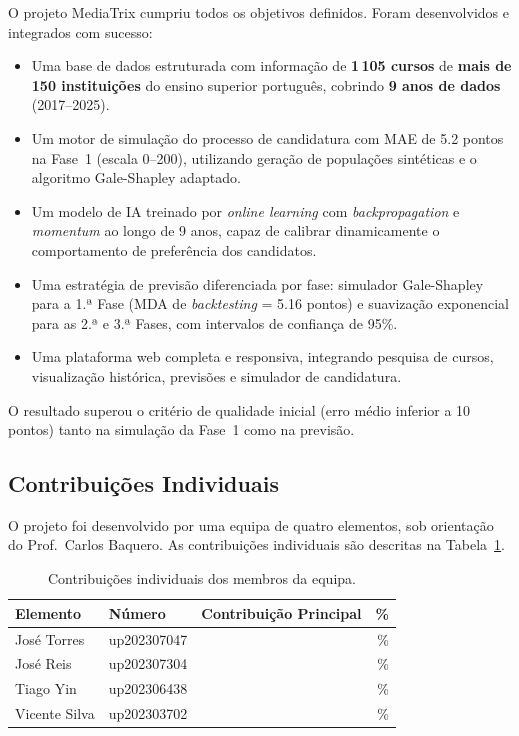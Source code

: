 \documentclass[12pt,a4paper]{article}
\begin{document}
O projeto MediaTrix cumpriu todos os objetivos definidos. Foram desenvolvidos e integrados com sucesso:

\begin{itemize}[noitemsep]
  \item Uma base de dados estruturada com informação de \textbf{1\,105 cursos} de \textbf{mais de 150 instituições} do ensino superior português, cobrindo \textbf{9 anos de dados} (2017--2025).
  \item Um motor de simulação do processo de candidatura com MAE de 5.2 pontos na Fase~1 (escala 0--200), utilizando geração de populações sintéticas e o algoritmo Gale-Shapley adaptado.
  \item Um modelo de IA treinado por \textit{online learning} com \textit{backpropagation} e \textit{momentum} ao longo de 9 anos, capaz de calibrar dinamicamente o comportamento de preferência dos candidatos.
  \item Uma estratégia de previsão diferenciada por fase: simulador Gale-Shapley para a 1.ª Fase (MDA de \textit{backtesting} = 5.16 pontos) e suavização exponencial para as 2.ª e 3.ª Fases, com intervalos de confiança de 95\%.
  \item Uma plataforma web completa e responsiva, integrando pesquisa de cursos, visualização histórica, previsões e simulador de candidatura.
\end{itemize}

O resultado superou o critério de qualidade inicial (erro médio inferior a 10 pontos) tanto na simulação da Fase~1 como na previsão.

\subsection{Contribuições Individuais}

O projeto foi desenvolvido por uma equipa de quatro elementos, sob orientação do Prof.\ Carlos Baquero. As contribuições individuais são descritas na Tabela~\ref{tab:contribuicoes}.

\begin{table}[H]
\centering
\caption{Contribuições individuais dos membros da equipa.}
\label{tab:contribuicoes}
\begin{tabularx}{\textwidth}{llXr}
\toprule
\textbf{Elemento} & \textbf{Número} & \textbf{Contribuição Principal} & \textbf{\%} \\
\midrule
José Torres   & up202307047 &  & \% \\
José Reis     & up202307304 &  & \% \\
Tiago Yin     & up202306438 &  & \% \\
Vicente Silva & up202303702  &  & \% \\
\bottomrule
\end{tabularx}
\end{table}
\end{document}
